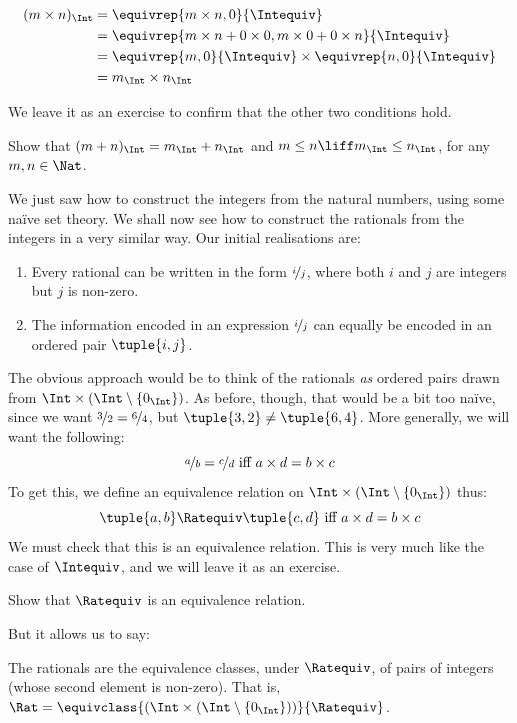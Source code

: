 	\begin{align*}

		(m \times n)_\Int  &= \equivrep{m \times n, 0}{\Intequiv} \\
		&= \equivrep{m \times n + 0 \times 0, m \times 0 + 0 \times n}{\Intequiv} \\
		&= \equivrep{m, 0}{\Intequiv} \times \equivrep{n, 0}{\Intequiv} \\
		&= m_\Int \times n_\Int
	\end{align*}

We leave it as an exercise to confirm that the other two conditions hold.
\begin{prob}
	Show that $(m + n)_\Int = m_\Int + n_\Int$ and $m \leq n \liff m_\Int \leq n_\Int$, for any $m, n \in \Nat$.
\end{prob}




We just saw how to construct the integers from the natural numbers,
using some na\"{i}ve set theory. We shall now see how to construct the
rationals from the integers in a very similar way. Our initial
realisations are:
\begin{enumerate}
	\item Every rational can be written in the form $\nicefrac{i}{j}$,
	where both $i$ and $j$ are integers but $j$ is non-zero.
	\item The information encoded in an expression $\nicefrac{i}{j}$
	can equally be encoded in an ordered pair $\tuple{ i, j}$.
\end{enumerate}
The obvious approach would be to think of the rationals \emph{as}
ordered pairs drawn from $\Int \times (\Int \setminus \{0_\Int\})$. As
before, though, that would be a bit too na\"ive, since we want
$\nicefrac{3}{2} = \nicefrac{6}{4}$, but $\tuple{ 3, 2}\neq \tuple{ 6,
4}$. More generally, we will want the following:
\[
	\nicefrac{a}{b} = \nicefrac{c}{d} \text{ iff } a \times d = b \times c
\]
To get this, we define an {equivalence relation} on  $\Int \times
(\Int \setminus \{0_\Int\})$ thus:
\[
	\tuple{ a, b }\Ratequiv \tuple{ c, d} \text{ iff }a \times d = b \times c
\]
We must check that this is an equivalence relation. This is very much
like the case of $\Intequiv$, and we will leave it as an exercise. 
\begin{prob}
Show that $\Ratequiv$ is an equivalence relation.
\end{prob}
But it allows us to say:
\begin{defn}
The rationals are the equivalence classes, under $\Ratequiv$, of pairs
of integers (whose second element is non-zero). That is, $\Rat =
\equivclass{(\Int \times (\Int\setminus \{0_\Int\}))}{\Ratequiv}$.
\end{defn}

